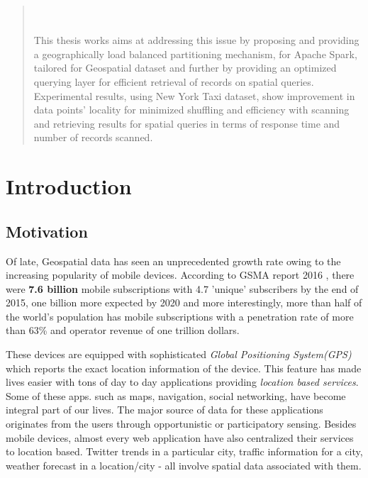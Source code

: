 \documentclass[article,type=msc,colorback,12pt,accentcolor=tud1d]{tudthesis}
\begin{document}
\begin{abstract}
		 \\ \\
		  This thesis works aims at addressing this issue by proposing and providing a geographically load balanced partitioning mechanism, for Apache Spark, tailored for Geospatial dataset and further by providing an optimized querying layer for efficient retrieval of records on spatial queries. Experimental results, using New York Taxi dataset, show  improvement in data points' locality for minimized shuffling and efficiency with scanning and retrieving results for spatial queries in terms of response time and number of records scanned.\cite{sparkbook}
		

\end{abstract}  

\clearpage



\setlength{ \parskip }{1em}
\tableofcontents 
\cleardoublepage 

\listoffigures
\clearpage
\appendix
\cleardoublepage 

	\hfill
  \section{Introduction}
  \hfill \break
 
		\subsection{Motivation}
		
		\par Of late, Geospatial data has seen an unprecedented growth rate owing to the increasing popularity of mobile devices. According to GSMA report 2016 \cite{GSMA_REPORT_2016}, there were \textbf{7.6 billion} mobile subscriptions with 4.7 'unique' subscribers by the end of 2015, one billion more expected by 2020 and more interestingly, more than half of the world's population has mobile subscriptions with a penetration rate of more than 63\% and operator revenue of one trillion dollars.
		
		These devices are equipped with sophisticated \textit{Global Positioning System(GPS)} which reports the exact location information of the device. This feature has made lives easier with tons of day to day applications providing \textit{location based services}. Some of these apps. such as maps, navigation, social networking, have become integral part of our lives. The major source of data for these applications originates from the users through opportunistic or participatory sensing. Besides mobile devices, almost every web application have also centralized their services to location based. Twitter trends in a particular city, traffic information for a city, weather forecast in a location/city - all involve spatial data associated with them. 
		
\end{document}
